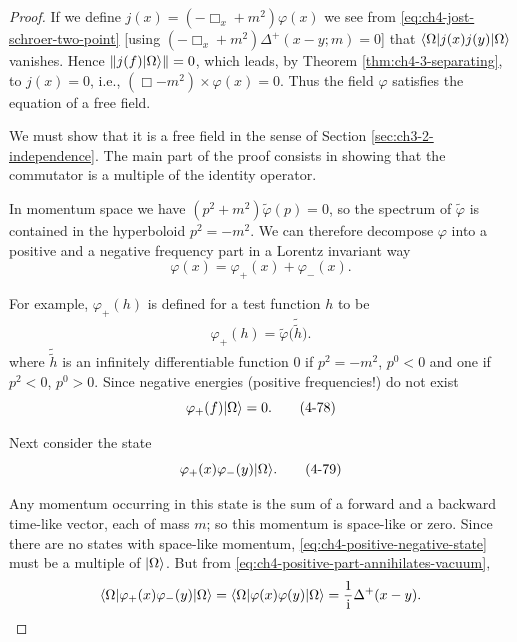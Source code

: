 \begin{proof}
If we define $j(x)=(-\Box_x+m^2)\varphi(x)$ we see from \eqref{eq:ch4-jost-schroer-two-point} [using
$(-\Box_x+m^2)\Delta^+(x-y;m)=0$] that
$\langle \Omega\rvert j(x)j(y)\lvert \Omega\rangle$ vanishes.  Hence
$\lVert j(f)\lvert \Omega\rangle\rVert=0$, which leads, by Theorem \ref{thm:ch4-3-separating}, to $j(x)=0$, i.e.,
$(\Box-m^2)\times\varphi(x)=0$.  Thus the field $\varphi$ satisfies the
equation of a free field.

We must show that it is a free field in the sense of Section \ref{sec:ch3-2-independence}.  The main
part of the proof consists in showing that the commutator is a multiple of the
identity operator.

In momentum space we have $(p^2+m^2)\widetilde{\varphi}(p)=0$, so the spectrum
of $\widetilde{\varphi}$ is contained in the hyperboloid $p^2=-m^2$.  We can
therefore decompose $\varphi$ into a positive and a negative frequency part
in a Lorentz invariant way
\begin{equation*}
  \varphi(x)=\varphi_+(x)+\varphi_-(x).
\end{equation*}

For example, $\varphi_+(h)$ is defined for a test function $h$ to be
\begin{equation*}
  \varphi_+(h)=\widetilde{\varphi}
  \bigl(\widetilde{\widetilde{h}}\bigr).
\end{equation*}
where $\widetilde{\widetilde h}$ is an infinitely differentiable function 0
if $p^2=-m^2$, $p^0<0$ and one if $p^2<0$, $p^0>0$.  Since negative energies
(positive frequencies!) do not exist
\begin{equation}
  \varphi_+(f)\lvert \Omega\rangle=0.
  \tag{4-78}\label{eq:ch4-positive-part-annihilates-vacuum}
\end{equation}

Next consider the state
\begin{equation}
  \varphi_+(x)\varphi_-(y)\lvert \Omega\rangle.
  \tag{4-79}\label{eq:ch4-positive-negative-state}
\end{equation}

Any momentum occurring in this state is the sum of a forward and a backward
time-like vector, each of mass $m$; so this momentum is space-like or zero.
Since there are no states with space-like momentum, \eqref{eq:ch4-positive-negative-state} must be a multiple
of $\lvert \Omega\rangle$.  But from \eqref{eq:ch4-positive-part-annihilates-vacuum},
\begin{equation*}
  \langle \Omega\rvert\varphi_+(x)\varphi_-(y)\lvert \Omega\rangle
  =
  \langle \Omega\rvert\varphi(x)\varphi(y)\lvert \Omega\rangle
  =\frac{1}{\mathrm{i}}\Delta^+(x-y).
\end{equation*}


\end{proof}
